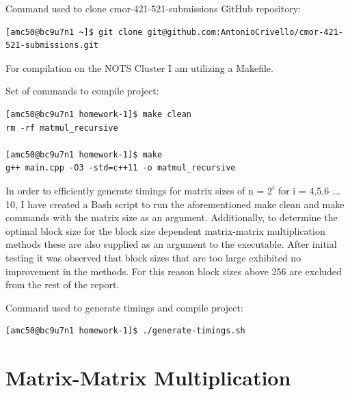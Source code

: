 \documentclass{article}
\begin{document}
\bigskip
\noindent Command used to clone cmor-421-521-submissions GitHub repository:
\begin{verbatim}
[amc50@bc9u7n1 ~]$ git clone git@github.com:AntonioCrivello/cmor-421-521-submissions.git    
\end{verbatim}

\bigskip
\noindent For compilation on the NOTS Cluster I am utilizing a Makefile. 

\bigskip
\noindent Set of commands to compile project: 
\begin{verbatim}
[amc50@bc9u7n1 homework-1]$ make clean
rm -rf matmul_recursive 

[amc50@bc9u7n1 homework-1]$ make
g++ main.cpp -O3 -std=c++11 -o matmul_recursive
\end{verbatim}

\bigskip
\noindent In order to efficiently generate timings for matrix sizes of n = $2^{i}$ for i = 4,5,6 ... 10, I have created a Bash script to run the aforementioned make clean and make commands with the matrix size as an argument. Additionally, to determine the optimal block size for the block size dependent matrix-matrix multiplication methods these are also supplied as an argument to the executable. After initial testing it was observed that block sizes that are too large exhibited no improvement in the methods. For this reason block sizes above 256 are excluded from the rest of the report.

\bigskip
\noindent Command used to generate timings and compile project:
\begin{verbatim}
[amc50@bc9u7n1 homework-1]$ ./generate-timings.sh 
\end{verbatim}

\section{Matrix-Matrix Multiplication}
\end{document}
